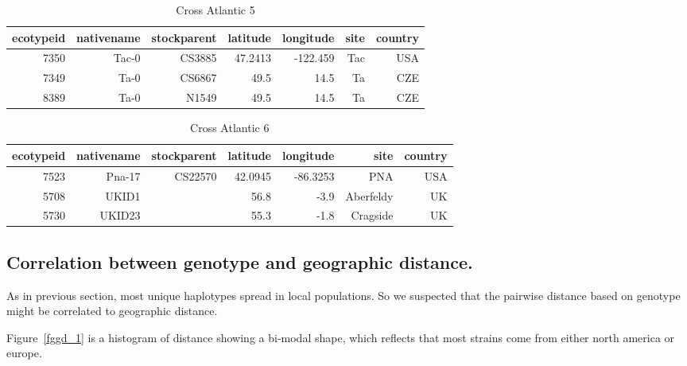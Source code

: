 \documentclass[a4paper,10pt]{article}
\begin{document}
\begin{table}
\caption{Cross Atlantic 5}
\begin{tabular}{|r|r|r|r|r|r|r|}
\hline
ecotypeid & nativename & stockparent & latitude & longitude & site & country\\
\hline
7350 & Tac-0      & CS3885      &  47.2413 &  -122.459 & Tac  & USA \\
7349 & Ta-0       & CS6867      &     49.5 &      14.5 & Ta   & CZE \\
8389 & Ta-0       & N1549       &     49.5 &      14.5 & Ta   & CZE \\
\hline
\end{tabular}
\label{thap_6}
\end{table}

\begin{table}
\caption{Cross Atlantic 6}
\begin{tabular}{|r|r|r|r|r|r|r|}
\hline
ecotypeid & nativename & stockparent & latitude & longitude & site & country\\
\hline
7523 & Pna-17     & CS22570     &  42.0945 &  -86.3253 & PNA       & USA \\
5708 & UKID1      &             &     56.8 &      -3.9 & Aberfeldy & UK  \\
5730 & UKID23     &             &     55.3 &      -1.8 & Cragside  & UK  \\
\hline
\end{tabular}
\label{thap_7}
\end{table}

\subsection{Correlation between genotype and geographic distance.}
As in previous section, most unique haplotypes spread in local populations. So we suspected that the pairwise distance based on genotype might be correlated to geographic distance.

Figure~\ref{fggd_1} is a histogram of distance showing a bi-modal shape, which reflects that most strains come from either north america or europe.
\end{document}
